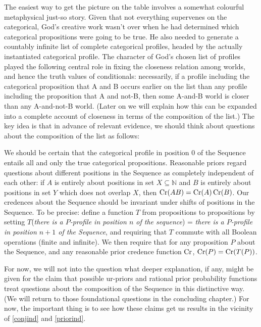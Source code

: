 \documentclass[If.tex]{subfiles}
\begin{document}
The easiest way to get the picture on the table involves a somewhat colourful metaphysical just-so story. Given that not everything supervenes on the categorical, God's creative work wasn't over when he had determined which categorical propositions were going to be true. He also needed to generate a countably infinite list of complete categorical profiles, headed by the actually instantiated categorical profile. The character of God's chosen list of profiles played the following central role in fixing the closeness relation among worlds, and hence the truth values of conditionals: necessarily, if a profile including the categorical proposition that A and B occurs earlier on the list than any profile including the proposition that A and not-B, then some A-and-B world is closer than any A-and-not-B world. (Later on we will explain how this can be expanded into a complete account of closeness in terms of the composition of the list.)  The key idea is that in advance of relevant evidence, we should think about questions about the composition of the list as follows: 
\begin{prop}
	\ritem \label{truthrequirement}
	We should be certain that the categorical profile in position 0 of the Sequence entails all and only the true categorical propositions.
	\ritem \label{independencerequirement}
	Reasonable priors regard questions about different positions in the Sequence as completely independent of each other: if $A$ is entirely about positions in set $X⊆\mathbb{N}$ and $B$ is entirely about positions in set $Y$ which does not overlap $X$, then $\operatorname{Cr}(AB) = \operatorname{Cr}(A)\operatorname{Cr}(B)$. 
	\ritem \label{invariancerequirement}
	Our credences about the Sequence should be invariant under shifts of positions in the Sequence.  To be precise: define a function $T$ from propositions to propositions by setting $T$(\emph{there is a $P$-profile in position $n$ of the sequence}) = \emph{there is a $P$-profile in position $n+1$ of the Sequence}, and requiring that $T$ commute with all Boolean operations (finite and infinite).  We then require that for any proposition $P$ about the Sequence, and any reasonable prior credence function $\operatorname{Cr}$, $\operatorname{Cr}(P) = \operatorname{Cr}(T(P))$.  	
\end{prop}
For now, we will not into the question what deeper explanation, if any, might be given for the claim that possible ur-priors and rational prior probability functions treat questions about the composition of the Sequence in this distinctive way.  (We will return to those foundational questions in the concluding chapter.)  For now, the important thing is to see how these claims get us results in the vicinity of \ref{conjind} and \ref{priorind}. 
\end{document}
